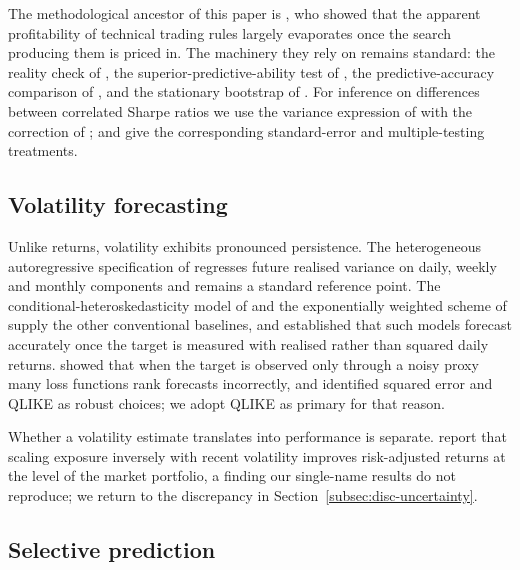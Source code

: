 \documentclass[pdflatex,sn-apa]{sn-jnl}%
\theoremstyle{thmstyleone}%
\theoremstyle{thmstyletwo}%
\theoremstyle{thmstylethree}%
\begin{document}
The methodological ancestor of this paper is \citet{sullivan1999datasnooping},
who showed that the apparent profitability of technical trading rules largely
evaporates once the search producing them is priced in. The machinery they rely
on remains standard: the reality check of \citet{white2000realitycheck}, the
superior-predictive-ability test of \citet{hansen2005spa}, the
predictive-accuracy comparison of \citet{diebold1995comparing}, and the
stationary bootstrap of \citet{politis1994stationary}. For inference on
differences between correlated Sharpe ratios we use the variance expression of
\citet{jobson1981performance} with the correction of
\citet{memmel2003performance}; \citet{lo2002statistics} and
\citet{bailey2014deflated} give the corresponding standard-error and
multiple-testing treatments.

\subsection{Volatility forecasting}\label{subsec:related-vol}

Unlike returns, volatility exhibits pronounced persistence. The heterogeneous
autoregressive specification of \citet{corsi2009har} regresses future realised
variance on daily, weekly and monthly components and remains a standard
reference point. The conditional-heteroskedasticity model of
\citet{bollerslev1986garch} and the exponentially weighted scheme of
\citet{riskmetrics1996} supply the other conventional baselines, and
\citet{andersen1998answering} established that such models forecast accurately
once the target is measured with realised rather than squared daily returns.
\citet{patton2011volatility} showed that when the target is observed only
through a noisy proxy many loss functions rank forecasts incorrectly, and
identified squared error and QLIKE as robust choices; we adopt QLIKE as primary
for that reason.

Whether a volatility estimate translates into performance is separate.
\citet{moreira2017volatility} report that scaling exposure inversely with
recent volatility improves risk-adjusted returns at the level of the market
portfolio, a finding our single-name results do not reproduce; we return to the
discrepancy in Section~\ref{subsec:disc-uncertainty}.

\subsection{Selective prediction}\label{subsec:related-selective}
\end{document}
